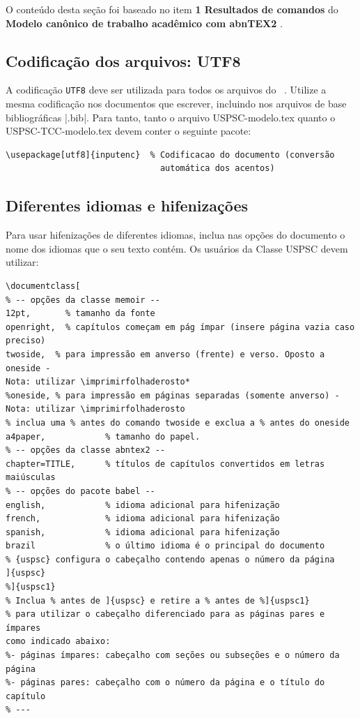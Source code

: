 O conteúdo desta seção foi baseado no item \textbf{1 Resultados de comandos} do \textbf{Modelo canônico de trabalho acadêmico com abnTEX2} \cite{equipeabntex2}.

\subsection{Codificação dos arquivos: UTF8}

A codificação \texttt{UTF8} deve ser utilizada para todos os arquivos do \abnTeX\ . Utilize a mesma codificação nos documentos que escrever, incluindo nos arquivos de base bibliográficas |.bib|. Para tanto, tanto o arquivo USPSC-modelo.tex  quanto o USPSC-TCC-modelo.tex devem conter o seguinte pacote:

\begin{verbatim}
\usepackage[utf8]{inputenc}	 % Codificacao do documento (conversão
                               automática dos acentos)
\end{verbatim}

\subsection{Diferentes idiomas e hifenizações}
\label{sec-hifenizacao}

Para usar hifenizações de diferentes idiomas, inclua nas opções do documento o
nome dos idiomas que o seu texto contém. Os usuários da Classe USPSC devem utilizar:

\begin{verbatim}
\documentclass[
% -- opções da classe memoir --
12pt,		% tamanho da fonte
openright,	% capítulos começam em pág ímpar (insere página vazia caso 
preciso)
twoside,  % para impressão em anverso (frente) e verso. Oposto a oneside - 
Nota: utilizar \imprimirfolhaderosto*
%oneside, % para impressão em páginas separadas (somente anverso) -  
Nota: utilizar \imprimirfolhaderosto
% inclua uma % antes do comando twoside e exclua a % antes do oneside 
a4paper,			% tamanho do papel. 
% -- opções da classe abntex2 --
chapter=TITLE,		% títulos de capítulos convertidos em letras 
maiúsculas
% -- opções do pacote babel --
english,			% idioma adicional para hifenização
french,				% idioma adicional para hifenização
spanish,			% idioma adicional para hifenização
brazil				% o último idioma é o principal do documento
% {uspsc} configura o cabeçalho contendo apenas o número da página
]{uspsc}
%]{uspsc1}
% Inclua % antes de ]{uspsc} e retire a % antes de %]{uspsc1}
% para utilizar o cabeçalho diferenciado para as páginas pares e ímpares 
como indicado abaixo:
%- páginas ímpares: cabeçalho com seções ou subseções e o número da página
%- páginas pares: cabeçalho com o número da página e o título do capítulo 
% ---
\end{verbatim}

